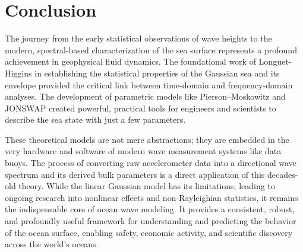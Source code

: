 \documentclass[journal,10pt,twocolumn]{IEEEtran}
\begin{document}
    \section{Conclusion}

    The journey from the early statistical observations of wave heights to the modern, spectral-based characterization of the sea surface represents a profound achievement in geophysical fluid dynamics. The foundational work of Longuet-Higgins in establishing the statistical properties of the Gaussian sea and its envelope provided the critical link between time-domain and frequency-domain analyses. The development of parametric models like Pierson--Moskowitz and JONSWAP created powerful, practical tools for engineers and scientists to describe the sea state with just a few parameters.

    These theoretical models are not mere abstractions; they are embedded in the very hardware and software of modern wave measurement systems like data buoys. The process of converting raw accelerometer data into a directional wave spectrum and its derived bulk parameters is a direct application of this decades-old theory. While the linear Gaussian model has its limitations, leading to ongoing research into nonlinear effects and non-Rayleighian statistics, it remains the indispensable core of ocean wave modeling. It provides a consistent, robust, and profoundly useful framework for understanding and predicting the behavior of the ocean surface, enabling safety, economic activity, and scientific discovery across the world's oceans.
\end{document}
